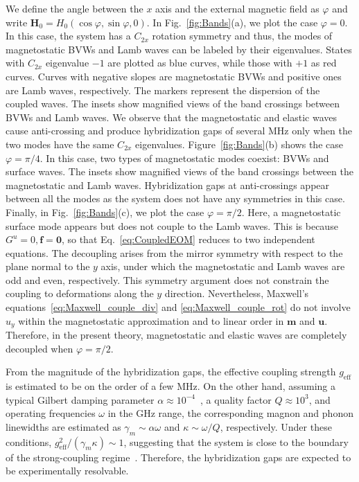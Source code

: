 \documentclass[aps,prb,10pt,amsmath,amssymb,twocolumn,longbibliography,superscriptaddress]{revtex4-2}
\begin{document}
We define the angle between the $x$ axis and the external magnetic field as $\varphi$ and write $\bm{H}_0=H_0(\cos\varphi,\sin\varphi,0)$. In Fig.~\ref{fig:Bands}(a), we plot the case $\varphi=0$. In this case, the system has a $C_{2x}$ rotation symmetry and thus, the modes of magnetostatic BVWs and Lamb waves can be labeled by their eigenvalues. States with $C_{2x}$ eigenvalue $-1$ are plotted as blue curves, while those with $+1$ as red curves. Curves with negative slopes are magnetostatic BVWs and positive ones are Lamb waves, respectively. The markers represent the dispersion of the coupled waves. The insets show magnified views of the band crossings between BVWs and Lamb waves. We observe that the magnetostatic and elastic waves cause anti-crossing and produce hybridization gaps of several MHz only when the two modes have the same $C_{2x}$ eigenvalues. Figure~\ref{fig:Bands}(b) shows the case $\varphi=\pi/4$. In this case, two types of magnetostatic modes coexist: BVWs and surface waves. The insets show magnified views of the band crossings between the magnetostatic and Lamb waves. Hybridization gaps at anti-crossings appear between all the modes as the system does not have any symmetries in this case. Finally, in Fig.~\ref{fig:Bands}(c), we plot the case $\varphi=\pi/2$. Here, a magnetostatic surface mode appears but does not couple to the Lamb waves. This is because $G^u=0,\bm{f}=\bm{0}$, so that Eq.~\eqref{eq:CoupledEOM} reduces to two independent equations. The decoupling arises from the mirror symmetry with respect to the plane normal to the $y$ axis, under which the magnetostatic and Lamb waves are odd and even, respectively. This symmetry argument does not constrain the coupling to deformations along the $y$ direction. Nevertheless, Maxwell's equations~\eqref{eq:Maxwell_couple_div} and \eqref{eq:Maxwell_couple_rot} do not involve $u_y$ within the magnetostatic approximation and to linear order in $\bm{m}$ and $\bm{u}$. Therefore, in the present theory, magnetostatic and elastic waves are completely decoupled when $\varphi=\pi/2$.

From the magnitude of the hybridization gaps, the effective coupling strength $g_{\mathrm{eff}}$ is estimated to be on the order of a few MHz. On the other hand, assuming a typical Gilbert damping parameter $\alpha \approx 10^{-4}$~\cite{YIGalpha_PRAppl}, a quality factor $Q \approx 10^3$, and operating frequencies $\omega$ in the GHz range, the corresponding magnon and phonon linewidths are estimated as $\gamma_m \sim \alpha \omega$ and $\kappa \sim \omega/Q$, respectively. Under these conditions, $g_{\mathrm{eff}}^2/(\gamma_m\kappa)\sim1$, suggesting that the system is close to the boundary of the strong-coupling regime~\cite{rodriguezClassicalQuantumDistinctions2016}. Therefore, the hybridization gaps are expected to be experimentally resolvable.
\end{document}
